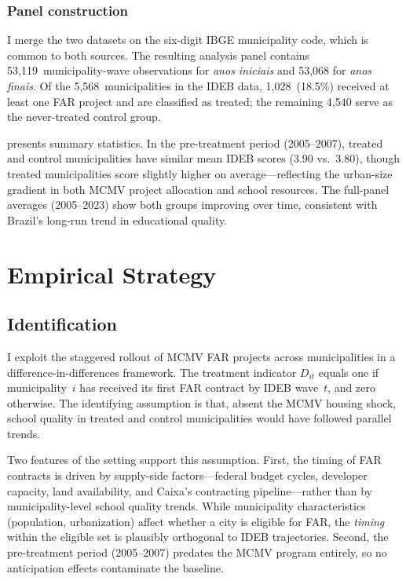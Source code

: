\documentclass[12pt]{article}
\begin{document}
\subsubsection*{Panel construction} I merge the two datasets on the six-digit IBGE municipality code, which is common to both sources. The resulting analysis panel contains 53,119~municipality-wave observations for \textit{anos iniciais} and 53,068 for \textit{anos finais}. Of the 5,568~municipalities in the IDEB data, 1,028~(18.5\%) received at least one FAR project and are classified as treated; the remaining 4,540 serve as the never-treated control group.



 presents summary statistics. In the pre-treatment period (2005--2007), treated and control municipalities have similar mean IDEB scores (3.90 vs.\ 3.80), though treated municipalities score slightly higher on average---reflecting the urban-size gradient in both MCMV project allocation and school resources. The full-panel averages (2005--2023) show both groups improving over time, consistent with Brazil's long-run trend in educational quality.


\section{Empirical Strategy}

\subsection{Identification}

I exploit the staggered rollout of MCMV FAR projects across municipalities in a difference-in-differences framework. The treatment indicator $D_{it}$ equals one if municipality~$i$ has received its first FAR contract by IDEB wave~$t$, and zero otherwise. The identifying assumption is that, absent the MCMV housing shock, school quality in treated and control municipalities would have followed parallel trends.

Two features of the setting support this assumption. First, the timing of FAR contracts is driven by supply-side factors---federal budget cycles, developer capacity, land availability, and Caixa's contracting pipeline---rather than by municipality-level school quality trends. While municipality characteristics (population, urbanization) affect whether a city is eligible for FAR, the \textit{timing} within the eligible set is plausibly orthogonal to IDEB trajectories. Second, the pre-treatment period (2005--2007) predates the MCMV program entirely, so no anticipation effects contaminate the baseline.
\end{document}

